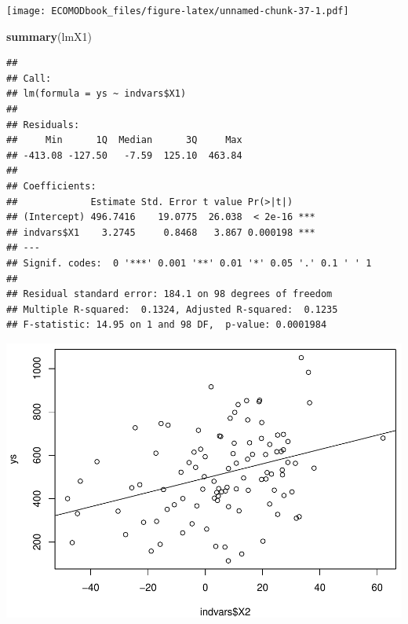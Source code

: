\documentclass[
]{book}
\newenvironment{Shaded}{\begin{snugshade}}{\end{snugshade}}
\newcommand{\FunctionTok}[1]{\textcolor[rgb]{0.13,0.29,0.53}{\textbf{#1}}}
\newcommand{\NormalTok}[1]{#1}
\newcommand{\OtherTok}[1]{\textcolor[rgb]{0.56,0.35,0.01}{#1}}
\newcommand{\SpecialCharTok}[1]{\textcolor[rgb]{0.81,0.36,0.00}{\textbf{#1}}}
\begin{document}
\texttt{[image: ECOMODbook\_files/figure-latex/unnamed-chunk-37-1.pdf]}

\begin{Shaded}
\begin{Highlighting}[]
\FunctionTok{summary}\NormalTok{(lmX1)}
\end{Highlighting}
\end{Shaded}

\begin{verbatim}
## 
## Call:
## lm(formula = ys ~ indvars$X1)
## 
## Residuals:
##     Min      1Q  Median      3Q     Max 
## -413.08 -127.50   -7.59  125.10  463.84 
## 
## Coefficients:
##             Estimate Std. Error t value Pr(>|t|)    
## (Intercept) 496.7416    19.0775  26.038  < 2e-16 ***
## indvars$X1    3.2745     0.8468   3.867 0.000198 ***
## ---
## Signif. codes:  0 '***' 0.001 '**' 0.01 '*' 0.05 '.' 0.1 ' ' 1
## 
## Residual standard error: 184.1 on 98 degrees of freedom
## Multiple R-squared:  0.1324, Adjusted R-squared:  0.1235 
## F-statistic: 14.95 on 1 and 98 DF,  p-value: 0.0001984
\end{verbatim}

\begin{Shaded}
\end{Shaded}

\includegraphics{ECOMODbook_files/figure-latex/unnamed-chunk-37-2.pdf}
\end{document}
